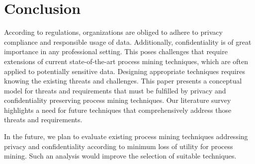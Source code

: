 \documentclass[manuscript]{acmart}
\begin{document}
\section{Conclusion}
\label{sec-conclusion}

According to regulations, organizations are obliged to adhere to privacy compliance and responsible usage of data. Additionally, confidentiality is of great importance in any professional setting. This poses challenges that require extensions of current state-of-the-art process mining techniques, which are often applied to potentially sensitive data. Designing appropriate techniques requires knowing the existing threats and challenges. This paper presents a conceptual model for threats and requirements that must be fulfilled by privacy and confidentiality preserving process mining techniques. Our literature survey highlights a need for future techniques that comprehensively address those threats and requirements.

In the future, we plan to evaluate existing process mining techniques addressing privacy and confidentiality according to minimum loss of utility for process mining. Such an analysis would improve the selection of suitable techniques.





\end{document}
